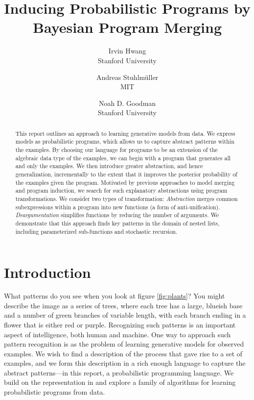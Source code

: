 \documentclass[a4paper,10pt]{article}
\begin{document}
\title{Inducing Probabilistic Programs by Bayesian Program Merging}
\author{Irvin Hwang\\Stanford University  \and Andreas Stuhlm\"{u}ller\\MIT \and Noah D. Goodman\\Stanford University}
\date{}
\maketitle
\thispagestyle{empty}
\begin{abstract}

This report outlines an approach to learning generative models from data. We express models as probabilistic programs, which allows us to capture abstract patterns within the examples. By choosing our language for programs to be an extension of the algebraic data type of the examples, we can begin with a program that generates all and only the examples. We then introduce greater abstraction, and hence generalization, incrementally to the extent that it improves the posterior probability of the examples given the program. Motivated by previous approaches to model merging and program induction, we search for such explanatory abstractions using program transformations. We consider two types of transformation: {\em Abstraction} merges common subexpressions within a program into new functions (a form of anti-unification). {\em Deargumentation} simplifies functions by reducing the number of arguments. We demonstrate that this approach finds key patterns in the domain of nested lists, including parameterized sub-functions and stochastic recursion.

\end{abstract}

\tableofcontents

\section{Introduction}

What patterns do you see when you look at figure \ref{fig:plants}? You might describe the image as a series of trees, where each tree has a large, blueish base and a number of green branches of variable length, with each branch ending in a flower that is either red or purple. Recognizing such patterns is an important aspect of intelligence, both human and machine.
One way to approach such pattern recognition is as the problem of learning generative models for observed examples. We wish to find a description of the process that gave rise to a set of examples, and we form this description in a rich enough language to capture the abstract patterns---in this report, a probabilistic programming language. 
We build on the representation in \cite{A.Stuhlmueller:2010:6d11a} and explore a family of algorithms for learning probabilistic programs from data.
\end{document}
